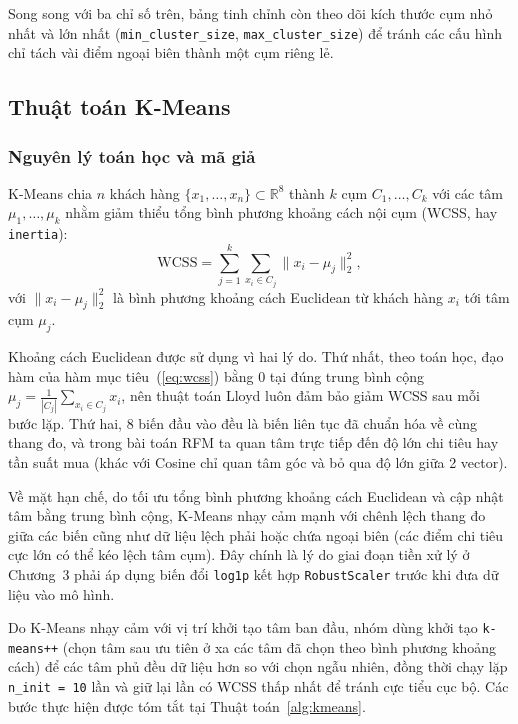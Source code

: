 \documentclass[12pt,a4paper]{article}
\numberwithin{equation}{section}
\numberwithin{table}{section}
\numberwithin{figure}{section}
\begin{document}
Song song với ba chỉ số trên, bảng tinh chỉnh còn theo dõi kích thước cụm nhỏ nhất và lớn nhất (\texttt{min\_cluster\_size}, \texttt{max\_cluster\_size}) để tránh các cấu hình chỉ tách vài điểm ngoại biên thành một cụm riêng lẻ.

\subsection{Thuật toán K-Means}

\subsubsection{Nguyên lý toán học và mã giả}

K-Means chia $n$ khách hàng $\{x_1, \ldots, x_n\} \subset \mathbb{R}^{8}$ thành $k$ cụm $C_1, \ldots, C_k$ với các tâm $\mu_1, \ldots, \mu_k$ nhằm giảm thiểu tổng bình phương khoảng cách nội cụm (WCSS, hay \texttt{inertia}):
\begin{equation}
    \mathrm{WCSS} = \sum_{j=1}^{k} \sum_{x_i \in C_j} \lVert x_i - \mu_j \rVert_2^2,
    \label{eq:wcss}
\end{equation}
với $\lVert x_i - \mu_j \rVert_2^2$ là bình phương khoảng cách Euclidean từ khách hàng $x_i$ tới tâm cụm $\mu_j$.

Khoảng cách Euclidean được sử dụng vì hai lý do. Thứ nhất, theo toán học, đạo hàm của hàm mục tiêu~(\ref{eq:wcss}) bằng $0$ tại đúng trung bình cộng $\mu_j = \frac{1}{|C_j|}\sum_{x_i \in C_j} x_i$, nên thuật toán Lloyd luôn đảm bảo giảm WCSS sau mỗi bước lặp. Thứ hai, 8 biến đầu vào đều là biến liên tục đã chuẩn hóa về cùng thang đo, và trong bài toán RFM ta quan tâm trực tiếp đến độ lớn chi tiêu hay tần suất mua (khác với Cosine chỉ quan tâm góc và bỏ qua độ lớn giữa 2 vector).

Về mặt hạn chế, do tối ưu tổng bình phương khoảng cách Euclidean và cập nhật tâm bằng trung bình cộng, K-Means nhạy cảm mạnh với chênh lệch thang đo giữa các biến cũng như dữ liệu lệch phải hoặc chứa ngoại biên (các điểm chi tiêu cực lớn có thể kéo lệch tâm cụm). Đây chính là lý do giai đoạn tiền xử lý ở Chương~3 phải áp dụng biến đổi \texttt{log1p} kết hợp \texttt{RobustScaler} trước khi đưa dữ liệu vào mô hình.

Do K-Means nhạy cảm với vị trí khởi tạo tâm ban đầu, nhóm dùng khởi tạo \texttt{k-means++} (chọn tâm sau ưu tiên ở xa các tâm đã chọn theo bình phương khoảng cách) để các tâm phủ đều dữ liệu hơn so với chọn ngẫu nhiên, đồng thời chạy lặp \texttt{n\_init = 10} lần và giữ lại lần có WCSS thấp nhất để tránh cực tiểu cục bộ. Các bước thực hiện được tóm tắt tại Thuật toán~\ref{alg:kmeans}.
\end{document}
